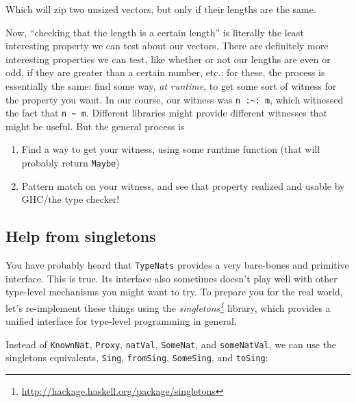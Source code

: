 \documentclass[]{article}
\renewcommand{\href}[2]{#2\footnote{\url{#1}}}
\begin{document}
Which will zip two unsized vectors, but only if their lengths are the same.

Now, ``checking that the length is a certain length'' is literally the least
interesting property we can test about our vectors. There are definitely more
interesting properties we can test, like whether or not our lengths are even or
odd, if they are greater than a certain number, etc.; for these, the process is
essentially the same: find some way, \emph{at runtime}, to get some sort of
witness for the property you want. In our course, our witness was
\texttt{n\ :\textasciitilde{}:\ m}, which witnessed the fact that
\texttt{n\ \textasciitilde{}\ m}. Different libraries might provide different
witnesses that might be useful. But the general process is

\begin{enumerate}
\def\labelenumi{\arabic{enumi}.}
\tightlist
\item
  Find a way to get your witness, using some runtime function (that will
  probably return \texttt{Maybe})
\item
  Pattern match on your witness, and see that property realized and usable by
  GHC/the type checker!
\end{enumerate}

\subsection{Help from singletons}\label{help-from-singletons}

You have probably heard that \texttt{TypeNats} provides a very bare-bones and
primitive interface. This is true. Its interface also sometimes doesn't play
well with other type-level mechanisms you might want to try. To prepare you for
the real world, let's re-implement these things using the
\emph{\href{http://hackage.haskell.org/package/singletons}{singletons}} library,
which provides a unified interface for type-level programming in general.

Instead of \texttt{KnownNat}, \texttt{Proxy}, \texttt{natVal}, \texttt{SomeNat},
and \texttt{someNatVal}, we can use the singletons equivalents, \texttt{Sing},
\texttt{fromSing}, \texttt{SomeSing}, and \texttt{toSing}:
\end{document}
